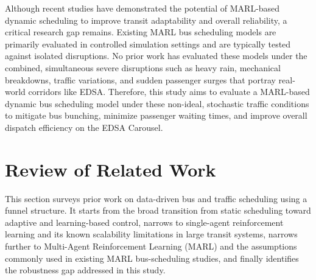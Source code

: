 Although recent studies have demonstrated the potential of MARL-based dynamic scheduling to improve transit adaptability and overall reliability, a critical research gap remains. Existing MARL bus scheduling models are primarily evaluated in controlled simulation settings and are typically tested against isolated disruptions. No prior work has evaluated these models under the combined, simultaneous severe disruptions such as heavy rain, mechanical breakdowns, traffic variations, and sudden passenger surges that portray real-world corridors like EDSA. Therefore, this study aims to evaluate a MARL-based dynamic bus scheduling model under these non-ideal, stochastic traffic conditions to mitigate bus bunching, minimize passenger waiting times, and improve overall dispatch efficiency on the EDSA Carousel.



\section{Review of Related Work}
This section surveys prior work on data-driven bus and traffic scheduling using a funnel structure. It starts from the broad transition from static scheduling toward adaptive and learning-based control, narrows to single-agent reinforcement learning and its known scalability limitations in large transit systems, narrows further to Multi-Agent Reinforcement Learning (MARL) and the assumptions commonly used in existing MARL bus-scheduling studies, and finally identifies the robustness gap addressed in this study.

